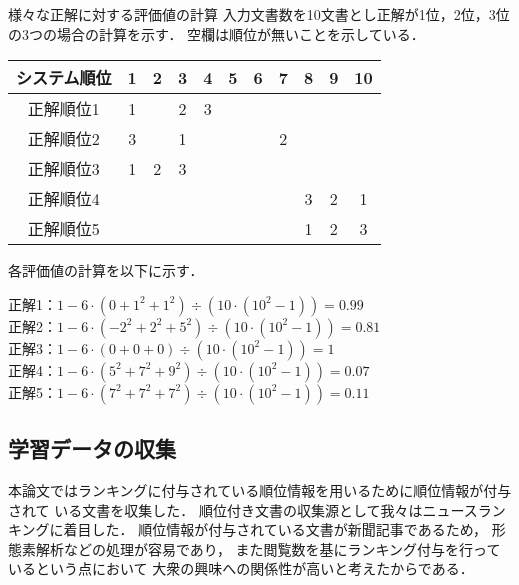 \documentclass[japanese]{jnlp_1.4}
\newcounter{ex}
\def\ex#1{}
\begin{document}
\begin{itembox}{\ex{}\label{evalex}様々な正解に対する評価値の計算}
入力文書数を10文書とし正解が1位，2位，3位の3つの場合の計算を示す．
空欄は順位が無いことを示している．
\vspace{0.5zw}
\begin{center}
{\small
\begin{tabular}{c|cccccccccc}
\hline
システム順位&1&2&3&4&5&6&7&8&9&10 \\
\hline
正解順位1&1&&2&3&&&&&& \\
正解順位2&3&&1&&&&2&&& \\
正解順位3&1&2&3&&&&&&& \\
正解順位4&&&&&&&&3&2&1 \\
正解順位5&&&&&&&&1&2&3 \\
\hline
\end{tabular}
}\end{center}
\vspace{0.5zw}
各評価値の計算を以下に示す．\\
{\setlength{\baselineskip}{12pt}
正解1：$1 - 6 \cdot ({0+1^2+1^2}) \div ({10\cdot(10^2-1)}) = 0.99$\\
正解2：$1 - 6 \cdot ({-2^2+2^2+5^2})\div({10\cdot(10^2-1)}) = 0.81 $\\
正解3：$1 - 6 \cdot ({0+0+0})\div({10\cdot(10^2-1)}) = 1 $\\
正解4：$1 - 6 \cdot ({5^2+7^2+9^2})\div({10\cdot(10^2-1)}) = 0.07$\\
正解5：$1 - 6 \cdot ({7^2+7^2+7^2})\div({10\cdot(10^2-1)}) = 0.11$
\par}
\end{itembox}



\subsection{学習データの収集}\label{sec_collect_learn}

本論文ではランキングに付与されている順位情報を用いるために順位情報が付与されて
いる文書を収集した．
順位付き文書の収集源として我々はニュースランキングに着目した．
順位情報が付与されている文書が新聞記事であるため，
形態素解析などの処理が容易であり，
また閲覧数を基にランキング付与を行っているという点において
大衆の興味への関係性が高いと考えたからである．
\end{document}
